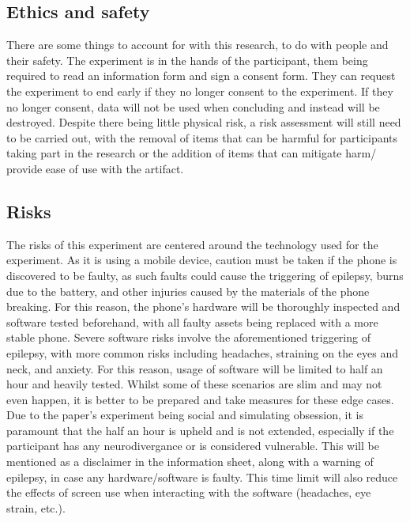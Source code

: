 \documentclass[conference]{IEEEtran}
\begin{document}
\subsection{Ethics and safety}
There are some things to account for with this research, to do with people and their safety. The experiment is in the hands of the participant, them being required to read an information form and sign a consent form. They can request the experiment to end early if they no longer consent to the experiment.  If they no longer consent, data will not be used when concluding and instead will be destroyed. Despite there being little physical risk, a risk assessment will still need to be carried out, with the removal of items that can be harmful for participants taking part in the research or the addition of items that can mitigate harm/ provide ease of use with the artifact.\\

\subsection{Risks}
The risks of this experiment are centered around the technology used for the experiment. As it is using a mobile device, caution must be taken if the phone is discovered to be faulty, as such faults could cause the triggering of epilepsy, burns due to the battery, and other injuries caused by the materials of the phone breaking. For this reason, the phone's hardware will be thoroughly inspected and software tested beforehand, with all faulty assets being replaced with a more stable phone. Severe software risks involve the aforementioned triggering of epilepsy, with more common risks including headaches, straining on the eyes and neck, and anxiety. For this reason, usage of software will be limited to half an hour and heavily tested. Whilst some of these scenarios are slim and may not even happen, it is better to be prepared and take measures for these edge cases.\\

Due to the paper's experiment being social and simulating obsession, it is paramount that the half an hour is upheld and is not extended, especially if the participant has any neurodivergance or is considered vulnerable. This will be mentioned as a disclaimer in the information sheet, along with a warning of epilepsy, in case any hardware/software is faulty. This time limit will also reduce the effects of screen use when interacting with the software (headaches, eye strain, etc.). \\
  
\end{document}
